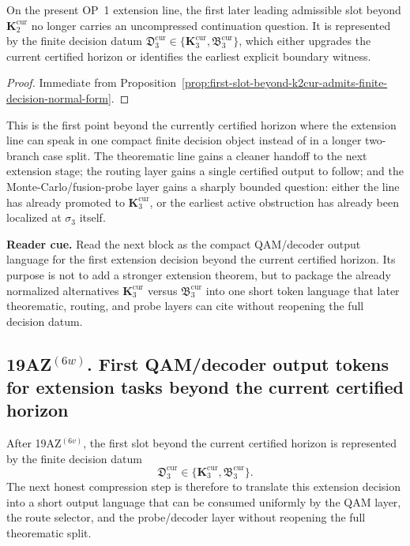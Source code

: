 \begin{corollary}
\label{cor:first-slot-beyond-current-certified-horizon-is-now-decision-normalized}
On the present OP~1 extension line, the first later leading admissible slot beyond $\mathbf K_2^{\mathrm{cur}}$ no longer carries an uncompressed continuation question. It is represented by the finite decision datum $\mathfrak D_3^{\mathrm{cur}}\in\{\mathbf K_3^{\mathrm{cur}},\mathfrak B_3^{\mathrm{cur}}\}$, which either upgrades the current certified horizon or identifies the earliest explicit boundary witness.
\end{corollary}

\begin{proof}
Immediate from Proposition~\ref{prop:first-slot-beyond-k2cur-admits-finite-decision-normal-form}.
\end{proof}

\begin{remark}
\label{rem:what-decision-normal-form-at-sigma3-now-buys}
This is the first point beyond the currently certified horizon where the extension line can speak in one compact finite decision object instead of in a longer two-branch case split. The theorematic line gains a cleaner handoff to the next extension stage; the routing layer gains a single certified output to follow; and the Monte-Carlo/fusion-probe layer gains a sharply bounded question: either the line has already promoted to $\mathbf K_3^{\mathrm{cur}}$, or the earliest active obstruction has already been localized at $\sigma_3$ itself.
\end{remark}




\noindent\textbf{Reader cue.} Read the next block as the compact QAM/decoder output language for the first extension decision beyond the current certified horizon. Its purpose is not to add a stronger extension theorem, but to package the already normalized alternatives \(\mathbf K_3^{\mathrm{cur}}\) versus \(\mathfrak B_3^{\mathrm{cur}}\) into one short token language that later theorematic, routing, and probe layers can cite without reopening the full decision datum.

\subsection*{19AZ$^{(6w)}$. First QAM/decoder output tokens for extension tasks beyond the current certified horizon}
\label{sec:first-qam-decoder-output-tokens-for-extension-tasks-beyond-current-certified-horizon}
After 19AZ$^{(6v)}$, the first slot beyond the current certified horizon is represented by the finite decision datum
\[
 \mathfrak D_3^{\mathrm{cur}}\in\{\mathbf K_3^{\mathrm{cur}},\mathfrak B_3^{\mathrm{cur}}\}.
\]
The next honest compression step is therefore to translate this extension decision into a short output language that can be consumed uniformly by the QAM layer, the route selector, and the probe/decoder layer without reopening the full theorematic split.

